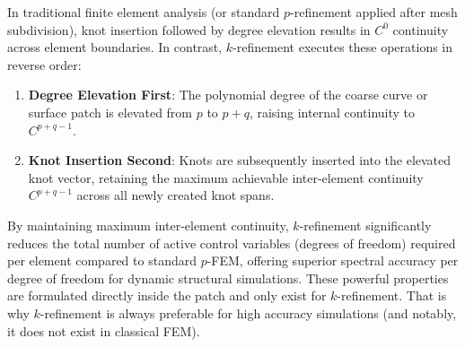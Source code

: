 In traditional finite element analysis (or standard $p$-refinement applied after mesh subdivision), knot insertion followed by degree elevation results in $C^0$ continuity across element boundaries. In contrast, $k$-refinement executes these operations in reverse order:
\begin{enumerate}[leftmargin=*]
    \item \textbf{Degree Elevation First}: The polynomial degree of the coarse curve or surface patch is elevated from $p$ to $p+q$, raising internal continuity to $C^{p+q-1}$.
    \item \textbf{Knot Insertion Second}: Knots are subsequently inserted into the elevated knot vector, retaining the maximum achievable inter-element continuity $C^{p+q-1}$ across all newly created knot spans.
\end{enumerate}

By maintaining maximum inter-element continuity, $k$-refinement significantly reduces the total number of active control variables (degrees of freedom) required per element compared to standard $p$-FEM, offering superior spectral accuracy per degree of freedom for dynamic structural simulations. These powerful properties are formulated directly inside the patch and only exist for $k$-refinement. That is why $k$-refinement is always preferable for high accuracy simulations (and notably, it does not exist in classical FEM).

